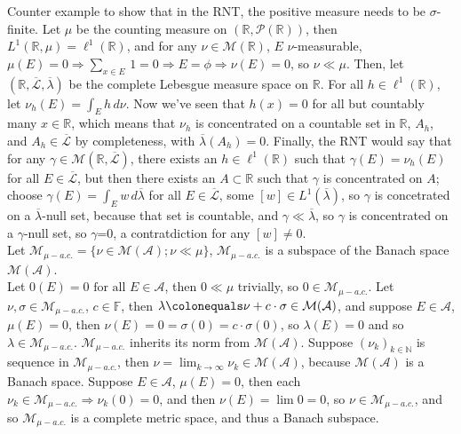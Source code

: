 \documentclass[12pt]{article}
\newcommand{\pset}[1]{ \mathcal{P}(#1) }
\newcommand{\fall}[0] { \textrm{ for all } }
\newcommand{\rimply}[0] { \Rightarrow }
\newcommand{\rarw}[0] { \rightarrow }
\newcommand{ \defeq }[0] { \colonequals }
\newcommand{\nats}[0] { \mathbb{N}}
\newcommand{\reals}[0] { \mathbb{R}}
\newcommand{\A}[0] { \mathcal{A} }
\newcommand{\M}[0] { \mathcal{M} }
\begin{document}
Counter example to show that in the RNT, the positive measure needs to be $\sigma$-finite. Let $\mu$ be the counting measure on $(\reals, \pset{\reals})$, then $L^1(\reals, \mu) = \ell^1(\reals)$, and for any $\nu \in \M(\reals)$, $E$ $\nu$-measurable, $\mu(E) = 0 \rimply \sum_{x \in E} \, 1 = 0 \rimply E = \phi \rimply \nu(E) = 0$, so $\nu \ll \mu$. Then, let $(\reals, \overline{\mathcal{L}}, \overline{\lambda})$ be the complete Lebesgue measure space on $\reals$. For all $h \in \ell^1(\reals)$, let $\nu_h(E) = \int_E h \, d\nu$. Now we've seen that $h(x) = 0$ for all but countably many $x \in \reals$, which means that $\nu_h$ is concentrated on a countable set in $\reals$, $A_h$, and $A_h \in \overline{\mathcal{L}}$ by completeness, with $\overline{\lambda}(A_h) = 0$. Finally, the RNT would say that for any $\gamma \in \M(\reals, \overline{\mathcal{L}})$, there exists an $h \in \ell^1(\reals)$ such that $\gamma(E) = \nu_h(E)$ for all $E \in \overline{\mathcal{L}}$, but then there exists an $A \subset \reals$ such that $\gamma$ is concentrated on $A$; choose $\gamma(E) = \int_E w \, d\overline{\lambda}$ for all $E \in \overline{\mathcal{L}}$, some $[w] \in L^1(\overline{\lambda})$, so $\gamma$ is concetrated on a $\overline{\lambda}$-null set, because that set is countable, and $\gamma \ll \overline{\lambda}$, so $\gamma$ is concentrated on a $\gamma$-null set, so $\gamma$=0, a contratdiction for any $[w] \not = 0$. \\





Let $\M_{\mu-a.c.} = \{ \nu \in \M(\A); \nu \ll \mu \}$, $\M_{\mu-a.c.}$ is a subspace of the Banach space $\M(\A)$.\\

\noindent Let $0(E) = 0 \fall E \in \A$, then $0 \ll \mu$ trivially, so $ 0 \in \M_{\mu-a.c.}$. Let $\nu, \sigma \in \M_{\mu-a.c.}$, $c \in \mathbb{F}$, then $\lambda \defeq \nu + c \cdot \sigma \in \M(\A)$, and suppose $E \in \A$, $\mu(E) = 0$, then $\nu(E) = 0 = \sigma(0) = c \cdot \sigma(0)$, so $\lambda(E) = 0$ and so $\lambda \in \M_{\mu-a.c.}$. $\M_{\mu-a.c.}$ inherits its norm from $\M(\A)$. Suppose $(\nu_k)_{k \in \nats}$ is sequence in $\M_{\mu-a.c.}$, then $\nu = \lim_{k \rarw \infty} \nu_k \in \M(\A)$, because $\M(\A)$ is a Banach space. Suppose $E \in \A$, $\mu(E) = 0$, then each $\nu_k \in \M_{\mu-a.c.} \rimply \nu_k(0) = 0$, and then $\nu(E) = \lim 0 = 0$, so $\nu \in \M_{\mu-a.c.}$, and so $\M_{\mu-a.c.} $ is a complete metric space, and thus a Banach subspace.\\
\end{document}
